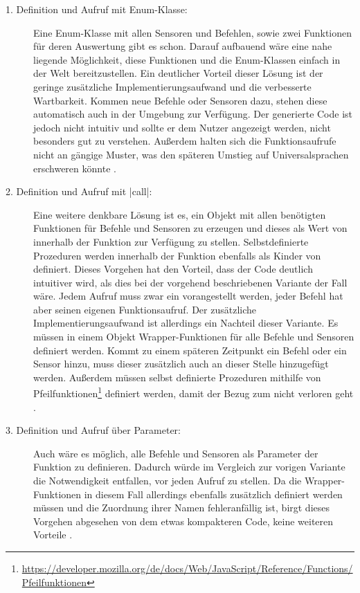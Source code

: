 \begin{description}
  \item[1. Definition und Aufruf mit Enum-Klasse:] Eine Enum-Klas\-se mit allen Sensoren und Befehlen, sowie zwei Funktionen für deren Auswertung gibt es schon. Darauf aufbauend wäre eine nahe liegende Möglichkeit, diese Funktionen und die Enum-Klas\-sen einfach in der Welt bereitzustellen. Ein deutlicher Vorteil dieser Lösung ist der geringe zusätzliche Implementierungsaufwand und die verbesserte Wartbarkeit. Kommen neue Befehle oder Sensoren dazu, stehen diese automatisch auch in der Umgebung zur Verfügung. Der generierte Code ist jedoch nicht intuitiv und sollte er dem Nutzer angezeigt werden, nicht besonders gut zu verstehen. Außerdem halten sich die Funktionsaufrufe nicht an gängige Muster, was den späteren Umstieg auf Universalsprachen erschweren könnte .
  \item[2. Definition und Aufruf mit \inlinec|call|:] Eine weitere denkbare Lösung ist es, ein Objekt mit allen benötigten Funktionen für Befehle und Sensoren zu erzeugen und dieses als Wert von  innerhalb der Funktion zur Verfügung zu stellen. Selbstdefinierte Prozeduren werden innerhalb der Funktion ebenfalls als Kinder von  definiert. Dieses Vorgehen hat den Vorteil, dass der Code deutlich intuitiver wird, als dies bei der vorgehend beschriebenen Variante der Fall wäre. Jedem Aufruf muss zwar ein  vorangestellt werden, jeder Befehl hat aber seinen eigenen Funktionsaufruf. Der zusätzliche Implementierungsaufwand ist allerdings ein Nachteil dieser Variante. Es müssen in einem Objekt Wrapper-Funk\-ti\-onen für alle Befehle und Sensoren definiert werden. Kommt zu einem späteren Zeitpunkt ein Befehl oder ein Sensor hinzu, muss dieser zusätzlich auch an dieser Stelle hinzugefügt werden. Außerdem müssen selbst definierte Prozeduren mithilfe von Pfeilfunktionen\footnote{\url{https://developer.mozilla.org/de/docs/Web/JavaScript/Reference/Functions/Pfeilfunktionen}} definiert werden, damit der Bezug zum  nicht verloren geht .
  \item[3. Definition und Aufruf über Parameter:] Auch wäre es möglich, alle Befehle und Sensoren als Parameter der Funktion zu definieren. Dadurch würde im Vergleich zur vorigen Variante die Notwendigkeit entfallen,  vor jeden Aufruf zu stellen. Da die Wrapper-Funk\-ti\-onen in diesem Fall allerdings ebenfalls zusätzlich definiert werden müssen und die Zuordnung ihrer Namen fehleranfällig ist, birgt dieses Vorgehen abgesehen von dem etwas kompakteren Code, keine weiteren Vorteile .

\end{description}
